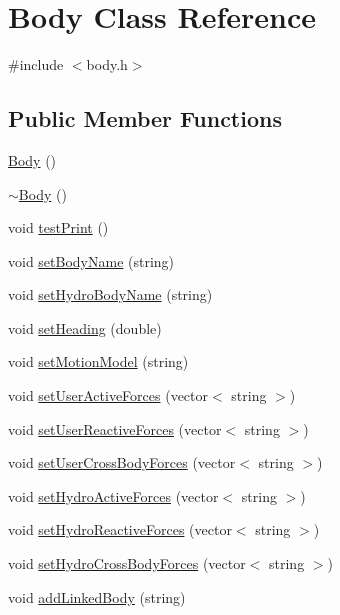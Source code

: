\hypertarget{class_body}{\section{Body Class Reference}
\label{class_body}
}


{\ttfamily \#include $<$body.\-h$>$}

\subsection*{Public Member Functions}
\begin{DoxyCompactItemize}
\item 
\hyperlink{class_body_a7727b0d8c998bbc2942e4c802e31e2eb}{Body} ()
\item 
\hyperlink{class_body_abe1c4da65568cf7978b6247affc461e3}{$\sim$\-Body} ()
\item 
void \hyperlink{class_body_a31b959b6f30e3c9c6ebc3f0a325fec9d}{test\-Print} ()
\item 
void \hyperlink{class_body_a21190f9d796d631202db6caf768beae1}{set\-Body\-Name} (string)
\item 
void \hyperlink{class_body_ac2cb95c1a4d24e6b456db9bfe3e6dea3}{set\-Hydro\-Body\-Name} (string)
\item 
void \hyperlink{class_body_a7bba55a8fd4aea7a17ce7bd5f54d6ab8}{set\-Heading} (double)
\item 
void \hyperlink{class_body_a8165a9147387e4fc34757dab76e11117}{set\-Motion\-Model} (string)
\item 
void \hyperlink{class_body_aaa26153bd320830684e65bbf538b139d}{set\-User\-Active\-Forces} (vector$<$ string $>$)
\item 
void \hyperlink{class_body_aa3b532c91892c7336309df492cad39d6}{set\-User\-Reactive\-Forces} (vector$<$ string $>$)
\item 
void \hyperlink{class_body_af409e4b49b838e118a57a753879685dc}{set\-User\-Cross\-Body\-Forces} (vector$<$ string $>$)
\item 
void \hyperlink{class_body_a34950bfba0878d2488f91a0f5a1ae918}{set\-Hydro\-Active\-Forces} (vector$<$ string $>$)
\item 
void \hyperlink{class_body_ae26fc5ecce5fd1803ce26bf87d1d2a2b}{set\-Hydro\-Reactive\-Forces} (vector$<$ string $>$)
\item 
void \hyperlink{class_body_a47aed2abb4a77b9da93a803f7fdd5e31}{set\-Hydro\-Cross\-Body\-Forces} (vector$<$ string $>$)
\item 
void \hyperlink{class_body_a1bcd87df62f0cdd063c01799c1631ebd}{add\-Linked\-Body} (string)

\end{DoxyCompactItemize}
